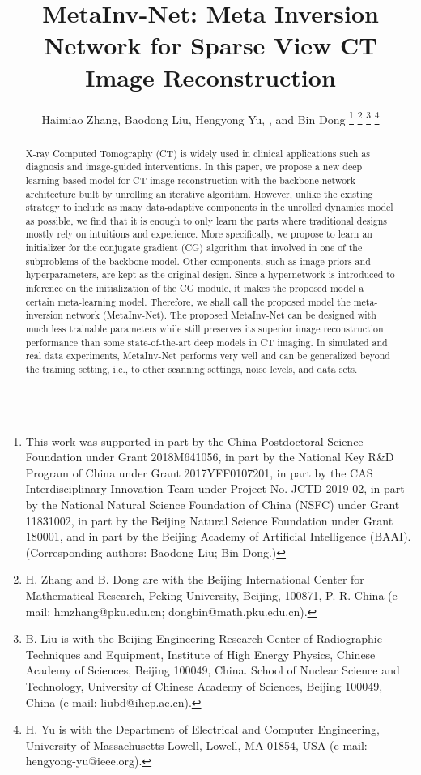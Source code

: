\documentclass[journal,twoside]{IEEEtran}
\begin{document}
\title{MetaInv-Net: Meta Inversion Network for Sparse View CT Image Reconstruction}
\author{Haimiao Zhang, Baodong Liu, Hengyong Yu, , and Bin Dong
\thanks{
This work was supported 
in part by the China Postdoctoral Science Foundation under Grant 2018M641056, 
in part by the National Key R\&D Program of China under Grant 2017YFF0107201, 
in part by the CAS Interdisciplinary Innovation Team under Project No. JCTD-2019-02,
in part by the National Natural Science Foundation of China (NSFC) under Grant 11831002, 
in part by the Beijing Natural Science Foundation under Grant 180001, 
and in part by the Beijing Academy of Artificial Intelligence (BAAI).
(Corresponding authors: Baodong Liu; Bin Dong.)
}
\thanks{
H. Zhang and B. Dong are with the Beijing International Center for Mathematical Research, Peking University, Beijing, 100871, P. R. China (e-mail: hmzhang@pku.edu.cn; dongbin@math.pku.edu.cn). }
\thanks{B. Liu is with the Beijing Engineering Research Center of Radiographic Techniques and Equipment, Institute of High Energy Physics, Chinese Academy of Sciences, Beijing 100049, China. School of Nuclear Science and Technology, University of Chinese Academy of Sciences, Beijing 100049, China (e-mail: liubd@ihep.ac.cn). }
\thanks{H. Yu is with the Department of Electrical and Computer Engineering, University of Massachusetts Lowell, Lowell, MA 01854, USA (e-mail: hengyong-yu@ieee.org).}
}
\maketitle


\begin{abstract}
X-ray Computed Tomography (CT) is widely used in clinical applications such as diagnosis and image-guided interventions. In this paper, we propose a new deep learning based model for CT image reconstruction with the backbone network architecture built by unrolling an iterative algorithm. However, unlike the existing strategy to include as many data-adaptive components in the unrolled dynamics model as possible, we find that it is enough to only learn the parts where traditional designs mostly rely on intuitions and experience. More specifically, we propose to learn an initializer for the conjugate gradient (CG) algorithm that involved in one of the subproblems of the backbone model. Other components, such as image priors and hyperparameters, are kept as the original design. Since a hypernetwork is introduced to inference on the initialization of the CG module, it makes the proposed model a certain meta-learning model. Therefore, we shall call the proposed model the meta-inversion network (MetaInv-Net). The proposed MetaInv-Net can be designed with much less trainable parameters while still preserves its superior image reconstruction performance than some state-of-the-art deep models in CT imaging. In simulated and real data experiments, MetaInv-Net performs very well and can be generalized beyond the training setting, i.e., to other scanning settings, noise levels, and data sets.
\end{abstract}
\end{document}
